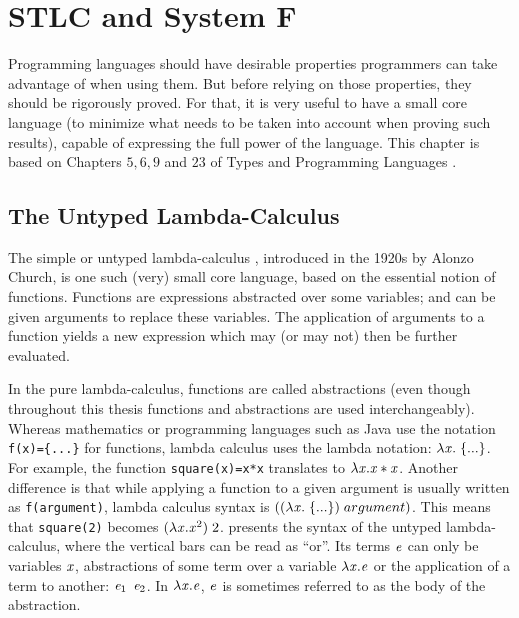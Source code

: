 \chapter{STLC and System F}
\label{cha:2}
Programming languages should have desirable properties programmers can take advantage of when using them. But before relying on those properties, they should be rigorously proved. For that, it is very useful to have a small core language (to minimize what needs to be taken into account when proving such results), capable of expressing the full power of the language. This chapter is based on Chapters $5,6,9$ and $23$ of Types and Programming Languages \cite{tapl}.

\section{The Untyped Lambda-Calculus}
The simple or untyped lambda-calculus \cite{lambdacalculus}, introduced in the 1920s by Alonzo Church, is one such (very) small core language, based on the essential notion of functions. Functions are expressions abstracted over some variables; and can be given arguments to replace these variables. The application of arguments to a function yields a new expression which may (or may not) then be further evaluated.

In the pure lambda-calculus, functions are called abstractions (even though throughout this thesis functions and abstractions are used interchangeably). Whereas mathematics or programming languages such as Java use the notation \texttt{f(x)=\{...\}} for functions, lambda calculus uses the lambda notation: $\lambda \mathit{x} .\; \{...\}$. For example, the function \texttt{square(x)=x*x} translates to $\lambda \mathit{x} . \mathit{x}*\mathit{x}$.  Another difference is that while applying a function to a given argument is usually written as \texttt{f(argument)}, lambda calculus syntax is $((\lambda \mathit{x} .\;\{...\} ) \; argument)$. This means that \texttt{square(2)} becomes $(\lambda \mathit{x} . \mathit{x}^2)\;2$.  presents the syntax of the untyped lambda-calculus, where the vertical bars can be read as ``or''. Its terms $\mathit{e}$ can only be variables $\mathit{x}$, abstractions of some term over a variable $\lambda \mathit{x}. \mathit{e}$ or the application of a term to another: $\mathit{e}_1$ $\mathit{e}_2$.  In $\lambda \mathit{x}. \mathit{e}$, $\mathit{e}$ is sometimes referred to as the body of the abstraction.

